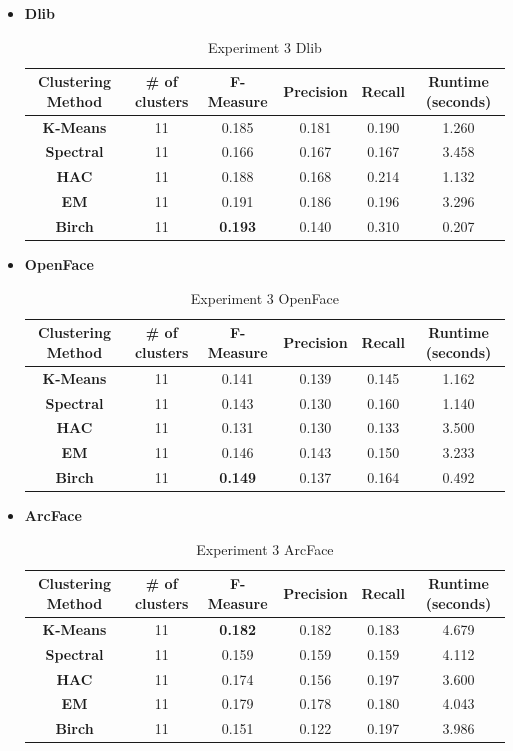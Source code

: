 \documentclass[12pt,english]{article}
\begin{document}
\begin{itemize}
\item \textbf{Dlib}
\begin{table}[H]
\centering
\begin{tabular}{||c c c c c c||} 
 \hline
 Clustering Method & \# of clusters & F-Measure & Precision & Recall & Runtime (seconds)\\ [0.5ex]
 \hline\hline
 \textbf{K-Means} & 11 & 0.185 & 0.181 & 0.190 & 1.260\\ 
 \hline
  \textbf{Spectral} & 11 & 0.166 & 0.167 & 0.167 & 3.458\\
 \hline
 \textbf{HAC} & 11 & 0.188 & 0.168 & 0.214 & 1.132\\
 \hline
 \textbf{EM} & 11 & 0.191 & 0.186 & 0.196 & 3.296\\
 \hline
 \textbf{Birch} & 11 & \textbf{0.193} & 0.140 & 0.310 & 0.207\\
 \hline
\end{tabular}
\caption{Experiment 3 Dlib}
\label{table:ex3dlib}
\end{table}

\item \textbf{OpenFace}
\begin{table}[H]
\centering
\begin{tabular}{||c c c c c c||} 
 \hline
 Clustering Method & \# of clusters & F-Measure & Precision & Recall & Runtime (seconds)\\ [0.5ex]
 \hline\hline
 \textbf{K-Means} & 11 & 0.141 & 0.139 & 0.145 & 1.162\\ 
 \hline
  \textbf{Spectral} & 11 & 0.143 & 0.130 & 0.160 & 1.140\\
 \hline
 \textbf{HAC} & 11 & 0.131 & 0.130 & 0.133 & 3.500\\
 \hline
 \textbf{EM} & 11 & 0.146 & 0.143 & 0.150 & 3.233\\
 \hline
 \textbf{Birch} & 11 & \textbf{0.149} & 0.137 & 0.164 & 0.492\\
 \hline
\end{tabular}
\caption{Experiment 3 OpenFace}
\label{table:ex3openface}
\end{table}

\item \textbf{ArcFace}
\begin{table}[H]
\centering
\begin{tabular}{||c c c c c c||} 
 \hline
 Clustering Method & \# of clusters & F-Measure & Precision & Recall & Runtime (seconds)\\ [0.5ex]
 \hline\hline
 \textbf{K-Means} & 11 & \textbf{0.182} & 0.182 & 0.183 & 4.679\\ 
 \hline
  \textbf{Spectral} & 11 & 0.159 & 0.159 & 0.159 & 4.112\\
 \hline
 \textbf{HAC} & 11 & 0.174 & 0.156 & 0.197 & 3.600\\
 \hline
 \textbf{EM} & 11 & 0.179 & 0.178 & 0.180 & 4.043\\
 \hline
 \textbf{Birch} & 11 & 0.151 & 0.122 & 0.197 & 3.986\\
 \hline
\end{tabular}
\caption{Experiment 3 ArcFace}
\label{table:ex3arcface}
\end{table}

\end{itemize}
\end{document}
